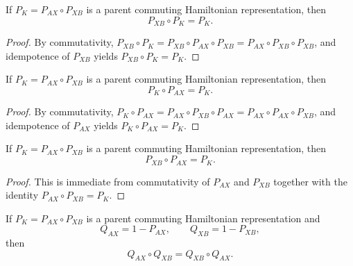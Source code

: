 \begin{theorem}%
    \label{thm:pXB_comp_pK}
    \leanok
    If $P_K = P_{AX} \circ P_{XB}$ is a parent commuting Hamiltonian
    representation, then
    \[
        P_{XB} \circ P_K = P_K.
    \]
\end{theorem}

\begin{proof}
    \leanok
    By commutativity,
    $P_{XB} \circ P_K = P_{XB} \circ P_{AX} \circ P_{XB}
        = P_{AX} \circ P_{XB} \circ P_{XB}$, and idempotence of $P_{XB}$
    yields $P_{XB} \circ P_K = P_K$.
\end{proof}

\begin{theorem}%
    \label{thm:pK_comp_pAX}
    \leanok
    If $P_K = P_{AX} \circ P_{XB}$ is a parent commuting Hamiltonian
    representation, then
    \[
        P_K \circ P_{AX} = P_K.
    \]
\end{theorem}

\begin{proof}
    \leanok
    By commutativity,
    $P_K \circ P_{AX} = P_{AX} \circ P_{XB} \circ P_{AX}
        = P_{AX} \circ P_{AX} \circ P_{XB}$, and idempotence of $P_{AX}$
    yields $P_K \circ P_{AX} = P_K$.
\end{proof}

\begin{theorem}%
    \label{thm:reverse_product}
    \leanok
    If $P_K = P_{AX} \circ P_{XB}$ is a parent commuting Hamiltonian
    representation, then
    \[
        P_{XB} \circ P_{AX} = P_K.
    \]
\end{theorem}

\begin{proof}
    \leanok
    This is immediate from commutativity of $P_{AX}$ and $P_{XB}$ together
    with the identity $P_{AX} \circ P_{XB} = P_K$.
\end{proof}

\begin{theorem}%
    \label{thm:complement_comm}
    \leanok
    If $P_K = P_{AX} \circ P_{XB}$ is a parent commuting Hamiltonian
    representation and
    \[
        Q_{AX} = 1 - P_{AX}, \qquad Q_{XB} = 1 - P_{XB},
    \]
    then
    \[
        Q_{AX} \circ Q_{XB} = Q_{XB} \circ Q_{AX}.
    \]
\end{theorem}

